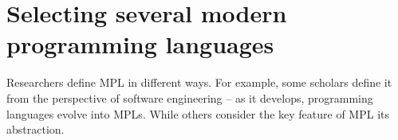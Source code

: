 \section{Selecting several modern programming languages}





Researchers define MPL in different ways.
For example, some scholars define it from the perspective of software
engineering – as it develops, programming languages evolve into MPLs\cite{ModernProgrammingLanguagesSoftwareEnginerring}.
While others consider the key feature of MPL its abstraction\cite{ModernProgrammingLanguagesAbstraction}.


